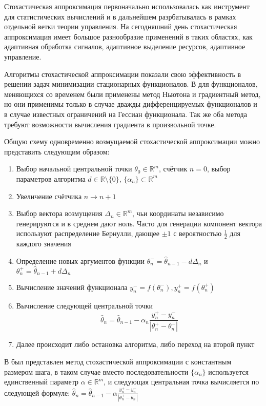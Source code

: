\documentclass{matmex-diploma}
\begin{document}
Стохастическая аппроксимация первоначально использовалась как инструмент для статистических вычислений и в дальнейшем разрбатывалась в рамках отдельной ветки теории управления. На сегодняшний день стохастическая аппроксимация имеет большое разнообразие применений в таких областях, как адаптивная обработка сигналов, адаптивное выделение ресурсов, адаптивное управление.

Алгоритмы стохастической аппроксимации показали свою эффективность в решении задач минимизации стационарных функционалов. В \cite{Polyak:1987} для функционалов, меняющихся со временем были применены метод Ньютона и градиентный метод, но они применимы только в случае дважды дифференцируемых функционалов и в случае известных ограничений на Гессиан функционала. Так же оба метода требуют возможности вычисления градиента в произвольной точке.

Общую схему одновременно возмущаемой стохастической аппроксимации можно представить следующим образом:

\begin{enumerate}
	\item Выбор начальной центральной точки $\theta_0 \in \mathbb{R}^m$, счётчик $n = 0$, выбор параметров алгоритма $d \in \mathbb{R} \setminus \{0\}$, $\{\alpha_n\} \subset \mathbb{R}^m$
	\item Увеличение счётчика $n \rightarrow n + 1$
	\item Выбор вектора возмущения $\Delta_n \in \mathbb{R}^m$, чьи координаты независимо генерируются и в среднем дают ноль. Часто для генерации компонент вектора используют распределение Бернулли, дающее $\pm1$ с вероятностью $\frac{1}{2}$ для каждого значения
	\item Определение новых аргументов функции $\theta_{n}^{-}=\hat{\theta}_{n - 1} - d\Delta_{n}$ и $\theta_{n}^{+}=\hat{\theta}_{n - 1} + d\Delta_{n}$
	\item Вычисление значений функционала $y_n^{-} = f(\theta_{n}^{-}), y_n^{+} = f(\theta_{n}^{+})$
	\item Вычисление следующей центральной точки 
	$$\hat{\theta}_n = \hat{\theta}_{n - 1} - \alpha_n \frac{y_n^{+} - y_n^{-}}{|\theta_{n}^{+} - \theta_{n}^{-}|}$$
	\item Далее происходит либо остановка алгоритма, либо переход на второй пункт
\end{enumerate}

В \cite{Granichin&Amelina:2015} был представлен метод стохастической аппроксимации с константным размером шага, в таком случае вместо последовательности $\{\alpha_n\}$ используется единственный параметр $\alpha \in \mathbb{R}^m$, и следующая центральная точка вычисляется по следующей формуле: $\hat{\theta}_n = \hat{\theta}_{n - 1} - \alpha \frac{y_n^{+} - y_n^{-}}{|\theta_{n}^{+} - \theta_{n}^{-}|}$



\end{document}
